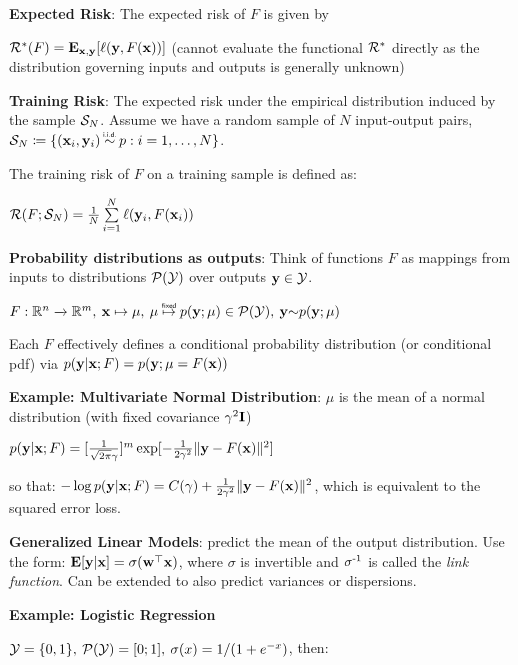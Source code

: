     \textbf{Expected Risk}: The expected risk of $F$ is given by

    \tab$\mathcal{R}^*(F)=\mathbf E_{\mathbf x,\mathbf y}\lbrack\ell(\mathbf y,F(\mathbf x))\rbrack$ (cannot evaluate the functional $\mathcal{R}^*$ directly as the distribution governing inputs and outputs is generally unknown)
    
    \textbf{Training Risk}: The expected risk under the empirical distribution induced by the sample $\mathcal{S}_N$. Assume we have a random sample of $N$ input-output pairs,\\$\cS_N\coloneqq\{(\vx_i,\vy_i) \mathrel{\overset{\makebox[0pt]{\mbox{\normalfont\tiny\sffamily i.i.d.}}}{\sim}}p:i=1,\ldots,N\}$.
    
    The training risk of $F$ on a training sample is defined as:
    
    \tab$\mathcal{R}(F;\mathcal{S}_N)=\frac{1}{N}\sum\limits_{i=1}^N\ell(\mathbf y_i,F(\mathbf x_i))$
    
    \textbf{Probability distributions as outputs}: Think of functions $F$ as mappings from inputs to distributions $\mathcal{P}(\mathcal{Y})$ over outputs $\mathbf y\in\mathcal{Y}$.
    
    \tab$F:\R^n\xrightarrow{}\R^m,\>\vx\mapsto\mu,\>\mu\mathrel{\overset{\makebox[0pt]{\mbox{\normalfont\tiny\sffamily fixed}}}{\mapsto}}p(\vy;\mu)\in\cP(\cY),\>\vy{\sim}p(\vy;\mu)$
    
    Each $F$ effectively defines a conditional probability distribution (or conditional pdf) via $p(\mathbf y|\mathbf x;F)=p(\mathbf y;\mu=F(\mathbf x))$
    
    \textbf{Example: Multivariate Normal Distribution}: $\mu$ is the mean of a normal distribution (with fixed covariance $\gamma^2\mathbf I$)
    
    \tab$p(\mathbf y|\mathbf x;F)=\lbrack\frac{1}{\sqrt{2\pi}\gamma}\rbrack^m \exp\lbrack-\frac{1}{2\gamma^2}\lVert\mathbf y-F(\mathbf x)\rVert^2\rbrack$
    
    so that: $-\log p(\mathbf y|\mathbf x;F)=C(\gamma) + \frac{1}{2\gamma^2}\lVert\mathbf y-F(\mathbf x)\rVert^2$, which is equivalent to the squared error loss. 
    
    \textbf{Generalized Linear Models}: predict the mean of the output distribution. Use the form:
    \tab$\mathbf E\lbrack\mathbf y|\mathbf x\rbrack=\sigma(\mathbf w^{\mathop{\mathrm{\top}}}\mathbf x)$, where $\sigma$ is invertible and $\sigma^{\text{-}1}$ is called the \emph{link function}. Can be extended to also predict variances or dispersions.
    
    \textbf{Example: Logistic Regression}
    
    $\mathcal{Y}=\{0,1\},\>\mathcal{P}(\mathcal{Y})=\lbrack0;1\rbrack,\>\sigma(x)=1/(1+e^{-x})$, then:
    
